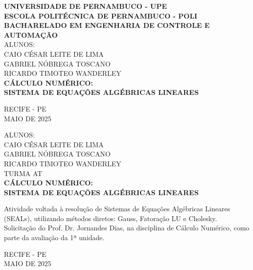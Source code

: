\documentclass[12pt,a4paper]{article}
\begin{document}
\begin{titlepage}
\begin{center}
    \large
    \textbf{UNIVERSIDADE DE PERNAMBUCO - UPE}\\
    \textbf{ESCOLA POLITÉCNICA DE PERNAMBUCO - POLI}\\
    \textbf{BACHARELADO EM ENGENHARIA DE CONTROLE E AUTOMAÇÃO}\\[3.5cm]

    ALUNOS:\\
    CAIO CÉSAR LEITE DE LIMA\\
    GABRIEL NÓBREGA TOSCANO\\
    RICARDO TIMOTEO WANDERLEY\\[2cm]

    \textbf{\Large CÁLCULO NUMÉRICO:\\ SISTEMA DE EQUAÇÕES ALGÉBRICAS LINEARES}\\
\end{center}

\vspace*{\fill}
\begin{center}
    RECIFE - PE\\
    MAIO DE 2025
\end{center}
\end{titlepage}

\begin{titlepage}
\begin{center}
    \large
    ALUNOS:\\
    CAIO CÉSAR LEITE DE LIMA\\
    GABRIEL NÓBREGA TOSCANO\\
    RICARDO TIMOTEO WANDERLEY\\[2cm]

    TURMA AT\\[2cm]

    \textbf{\Large CÁLCULO NUMÉRICO:\\ SISTEMA DE EQUAÇÕES ALGÉBRICAS LINEARES}\\
\end{center}

\vspace{1cm}

\begin{flushright}
\begin{minipage}{0.5\textwidth}
\justifying
Atividade voltada à resolução de Sistemas de Equações Algébricas Lineares (SEALs), utilizando métodos diretos: Gauss, Fatoração LU e Cholesky. Solicitação do Prof. Dr. Jornandes Dias, na disciplina de Cálculo Numérico, como parte da avaliação da 1ª unidade.
\end{minipage}
\end{flushright}

\vspace*{\fill}
\begin{center}
    RECIFE - PE\\
    MAIO DE 2025
\end{center}
\end{titlepage}
\end{document}

